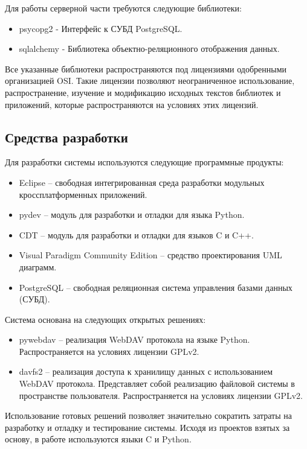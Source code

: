 \documentclass[utf8,usehyperref,12pt]{G7-32}
\begin{document}
Для работы серверной части требуются следующие библиотеки:

\begin{itemize}
 \item psycopg2 - Интерфейс к СУБД PostgreSQL.
 \item sqlalchemy - Библиотека объектно-реляционного отображения данных\cite{sqlalchemy}.
\end{itemize}

Все указанные библиотеки распространяются под лицензиями одобренными организацией OSI. Такие лицензии позволяют неограниченное использование, распространение, изучение и модификацию исходных текстов библиотек и приложений, которые распространяются на условиях этих лицензий.

\subsection{Средства разработки}

Для разработки системы используются следующие программные продукты:
\begin{itemize}
 \item Eclipse -- свободная интегрированная среда разработки модульных кроссплатформенных приложений.
 \item pydev -- модуль для разработки и отладки для языка Python.
 \item CDT -- модуль для разработки и отладки для языков C и C++.
 \item Visual Paradigm Community Edition -- средство проектирования UML\cite{uml_book} диаграмм.
 \item PostgreSQL -- свободная реляционная система управления базами данных (СУБД)\cite{pg_book}.  
\end{itemize}

Система основана на следующих открытых решениях:
\begin{itemize}
 \item pywebdav -- реализация WebDAV протокола на языке Python. Распространяется на условиях лицензии GPLv2.
 \item davfs2 -- реализация доступа к хранилищу данных с использованием WebDAV протокола. Представляет собой реализацию файловой системы в пространстве пользователя. Распространяется на условиях лицензии GPLv2.
\end{itemize}

Использование готовых решений позволяет значительно сократить затраты на разработку и отладку и тестирование системы. Исходя из проектов взятых за основу, в работе используются языки C\cite{c_book}\cite{stivens} и Python\cite{python_book}. 
\end{document}

